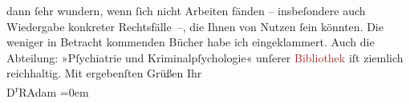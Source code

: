                     dann ſehr wundern, wenn ſich nicht Arbeiten fänden – insbeſondere auch
                    Wiedergabe konkreter Rechtsfälle –, die Ihnen von Nutzen ſein könnten.\pend
           \pstart
           Die weniger in Betracht kommenden Bücher habe ich eingeklammert.\pend
           \pstart
           Auch die Abteilung: »Pſychiatrie und Kriminalpſychologie« unſerer \textcolor{brown}{Bibliothek}{} iſt ziemlich reichhaltig.\pend
           \pstart
           Mit ergebenſten Grüßen\pend
           \pstart
           Ihr{\\[\baselineskip]}\spacefill\mbox{D\textsuperscript{r}RAdam}\pend
           \leftskip=0em{}\endnumbering{}  
      